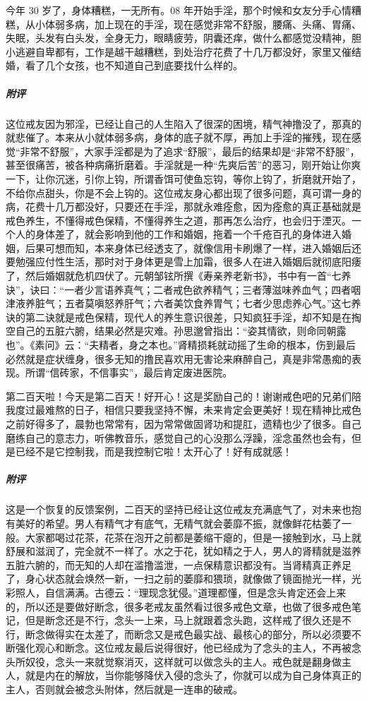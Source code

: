 \begin{case}
    今年 30 岁了，身体糟糕，一无所有。08 年开始手淫，那个时候和女友分手心情糟糕，从小体弱多病，加上现在的手淫，现在感觉非常不舒服，腰痛、头痛、胃痛、失眠，头发有白头发，全身无力，眼睛疲劳，阴囊还痒，做什么都感觉没精神，胆小逃避自卑都有，工作是越干越糟糕，到处治疗花费了十几万都没好，家里又催结婚，看了几个女孩，也不知道自己到底要找什么样的。
    \subparagraph{附评} 这位戒友因为邪淫，已经让自己的人生陷入了很深的困境，精气神撸没了，那真的就悲催了。本来从小就体弱多病，身体的底子就不厚，再加上手淫的摧残，现在感觉“非常不舒服”，大家手淫都是为了追求“舒服”，最后的结果却是“非常不舒服”，甚至很痛苦，被各种病痛折磨着。手淫就是一种“先爽后苦”的恶习，刚开始让你爽一下，让你沉迷，引你上钩，所谓香饵可使鱼忘钩，等你上钩了，折磨就开始了，不给你点甜头，你是不会上钩的。这位戒友身心都出现了很多问题，真可谓一身的病，花费十几万都没好，只要还在手淫，那就永难痊愈，因为痊愈的真正基础就是戒色养生，不懂得戒色保精，不懂得养生之道，那再怎么治疗，也会归于湮灭。一个人的身体差了，就会影响到他的工作和婚姻，拖着一个千疮百孔的身体进入婚姻，后果可想而知，本来身体已经透支了，就像信用卡刷爆了一样，进入婚姻后还要勉强应付性生活，那时对于身体更是雪上加霜，很多人在进入婚姻后就彻底阳痿了，然后婚姻就危机四伏了。元朝邹铉所撰《寿亲养老新书》，书中有一首“七养诀”，诀曰：“一者少言语养真气；二者戒色欲养精气；三者薄滋味养血气；四者咽津液养脏气；五者莫嗔怒养肝气；六者美饮食养胃气；七者少思虑养心气。”这七养诀的第二诀就是戒色保精，现代人的养生意识很差，只知疯狂手淫，却不知是在掏空自己的五脏六腑，结果必然是灾难。孙思邈曾指出：“姿其情欲，则命同朝露也”。《素问》云：“夫精者，身之本也。”肾精损耗就动摇了生命的根本，伤到最后必然就是症状缠身，很多无知的撸民喜欢用无害论来麻醉自己，真是非常愚痴的表现。所谓“信砖家，不信事实”，最后肯定废进医院。
\end{case}

\begin{case}
    第二百天啦！今天是第二百天！好开心！这是奖励自己的！谢谢戒色吧的兄弟们陪我度过最难熬的日子，相信只要我坚持不懈，未来肯定会更美好！现在精神比戒色之前好得多了，晨勃也常常有，因为常常做固肾功和提肛，遗精也少了很多。自己磨练自己的意志力，听佛教音乐，感觉自己的心没那么浮躁，淫念虽然也会有，但是已经不是它控制我，而是我控制它啦！太开心了！好有成就感！
    \subparagraph{附评} 这是一个恢复的反馈案例，二百天的坚持已经让这位戒友充满底气了，对未来也抱有美好的希望。男人有精气才有底气，无精气就会萎靡不振，就像鲜花枯萎了一般。大家都喝过花茶，花茶在泡开之前都是萎缩干瘪的，但是一接触到水，马上就舒展和滋润了，完全就不一样了。水之于花，犹如精之于人，男人的肾精就是滋养五脏六腑的，而无知的人却在滥撸滥泄，一点保精意识都没有。当肾精真正养足了，身心状态就会焕然一新，一扫之前的萎靡和猥琐，就像做了镜面抛光一样，光彩照人，自信满满。古德云：“理现念犹侵。”道理都懂，但是念头肯定还会上来的，所以还是要做好断念，很多老戒友虽然看过很多戒色文章，也做了很多戒色笔记，但是断念还是不行，念头一上来，马上就跟着念头跑，这样戒了很久还是不行，断念做得实在太差了，而断念又是戒色最实战、最核心的部分，所以必须要不断强化观心和断念。这位戒友最后说得很好，他已经成为了念头的主人，不再被念头所奴役，念头一来就觉察消灭，这样就可以做念头的主人。戒色就是翻身做主人，就是内在的解放，当你能够降伏入侵的念头了，你就可以成为自己身体真正的主人，否则就会被念头附体，然后就是一连串的破戒。
\end{case}

